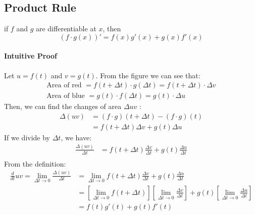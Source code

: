 \documentclass[12pt]{article}
\begin{document}
\subsection{Product Rule}
if $f$ and $g$ are differentiable at $x$, then
\[
    (f \cdot g (x))' = f(x)g'(x) + g(x)f'(x)
\]

\paragraph{Intuitive Proof}

\begin{figure}[h!]
    \centering
\end{figure}

Let $u = f(t)$ and $v = g(t)$. From the figure we can see that:
\begin{align*} 
     \textrm{Area of red } = f(t + \Delta t) \cdot g(\Delta t) = f(t + \Delta t) \cdot \Delta v\\
     \textrm{Area of blue } = g(t) \cdot f(\Delta t) = g(t) \cdot \Delta u
\end{align*}
Then, we can find the changes of area $\Delta uv$ :
\begin{align*} 
    \Delta (uv) &= (f \cdot g)(t + \Delta t) - (f \cdot g)(t) \\
    &= f(t + \Delta t) \Delta v + g(t) \Delta u 
\end{align*}
If we divide by $\Delta t$, we have:
\begin{align*} 
    \frac{\Delta (uv)}{\Delta t} &= f(t + \Delta t) \frac{\Delta v}{\Delta t}  + g(t) \frac{\Delta u}{\Delta t} \\
\end{align*}
From the definition:
\begin{align*} 
    \frac{d}{dt} uv = \lim_{\Delta t \to 0} \frac{\Delta (uv)}{\Delta t} &= \lim_{\Delta t \to 0} f(t + \Delta t) \frac{\Delta v}{\Delta t}  + g(t) \frac{\Delta u}{\Delta t} \\
    &= \left[\lim_{\Delta t \to 0} f(t + \Delta t) \right] \left[\lim_{\Delta t \to 0} \frac{\Delta v}{\Delta t} \right]  + g(t) \left[\lim_{\Delta t \to 0} \frac{\Delta u}{\Delta t} \right]\\
    &= f(t)g'(t) + g(t)f'(t)
\end{align*}
\end{document}
